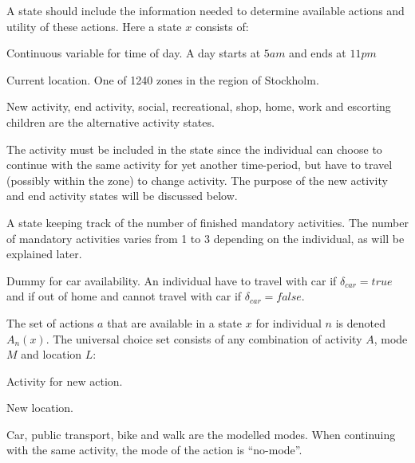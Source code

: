 A state should include the information needed to determine available actions and utility of these actions. Here a state $x$ consists of:
\begin{description}[style=multiline,leftmargin=4cm,font=\normalfont]
\item[{Time $t \in [5\unit{am},11\unit{pm}] $}:] Continuous variable for time of day. A day starts at $5\unit{am}$ and ends at $11\unit{pm}$
\item[{Location $L \in [1,1240]$:}] Current location. One of 1240 zones in the region of Stockholm. 
\item[Activity $A$:] New activity, end activity, social, recreational, shop, home, work and escorting children are the alternative activity states. 

The activity must be included in the state since the individual can choose to continue with the same activity for yet another time-period, but have to travel (possibly within the zone) to change activity. The purpose of the new activity and end activity states will be discussed below.
\item[{Errand indicator $E \in [0,3]$:}] A state keeping track of the number of finished mandatory activities. The number of mandatory activities varies from 1 to 3 depending on the individual, as will be explained later. 
\item[Car dummy $\delta_{car} \in \{true,false\}$:] Dummy for car availability. An individual have to travel with car if $\delta_{car} = true$ and if out of home and cannot travel with car if $\delta_{car} = false$.
\end{description}


The set of actions $a$ that are available in a state $x$ for individual $n$ is denoted $A_n(x)$. The universal choice set consists of any combination of activity $A$, mode $M$ and location $L$:
\begin{description}[style=multiline,leftmargin=4cm,font=\normalfont]
\item[{Activity $A$}:] Activity for new action.
\item[{Location $L$}:] New location. 
\item[{Mode}:] Car, public transport, bike and walk are the modelled modes. When continuing with the same activity, the mode of the action is ``no-mode''.
\end{description}

